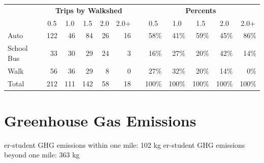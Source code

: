 \documentclass[12pt,letterpaper]{report}\usepackage{graphicx, color}
\newcommand{\factoid}[1]{\flushleft{\large{#1}}}
\begin{document}
%
\begin{table}[!htbp]
\begin{center}
\begin{tabular}{lcrrrrrcrrrrr}
\hline
\multicolumn{1}{c}{\bfseries }&\multicolumn{1}{c}{\bfseries }&\multicolumn{5}{c}{\bfseries Trips by Walkshed}&\multicolumn{1}{c}{\bfseries }&\multicolumn{5}{c}{\bfseries Percents}\tabularnewline
\cline{1-13}
\multicolumn{1}{c}{}&\multicolumn{1}{c}{}&\multicolumn{1}{c}{0.5}&\multicolumn{1}{c}{1.0}&\multicolumn{1}{c}{1.5}&\multicolumn{1}{c}{2.0}&\multicolumn{1}{c}{2.0+}&\multicolumn{1}{c}{}&\multicolumn{1}{c}{0.5}&\multicolumn{1}{c}{1.0}&\multicolumn{1}{c}{1.5}&\multicolumn{1}{c}{2.0}&\multicolumn{1}{c}{2.0+}\tabularnewline
\hline
Auto&&122&46&84&26&16&&58\%&41\%&59\%&45\%&86\%\tabularnewline
School Bus&&33&30&29&24&3&&16\%&27\%&20\%&42\%&14\%\tabularnewline
Walk&&56&36&29&8&0&&27\%&32\%&20\%&14\%&0\%\tabularnewline
Total&&212&111&142&58&18&&100\%&100\%&100\%&100\%&100\%\tabularnewline
\hline
\end{tabular}
\end{center}
\end{table}




% 
% 
\newpage
\section*{Greenhouse Gas Emissions}
{\factoid Per-student GHG emissions within one mile: 102 kg}
{\factoid Per-student GHG emissions beyond one mile: 363 kg}
\end{document}
